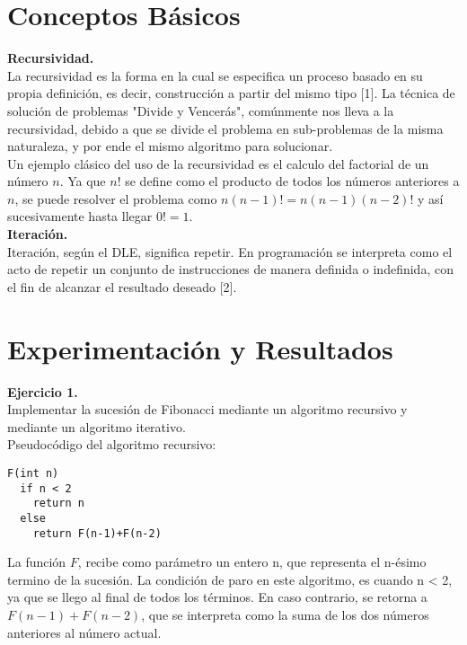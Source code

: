 \documentclass[12pt]{report}
\begin{document}
	\section{Conceptos Básicos}
	\textbf{Recursividad.}\\
	La recursividad es la forma en la cual se especifica un proceso basado en su propia definición, es decir, construcción a partir del mismo tipo [1]. La técnica de solución de problemas "Divide y Vencerás", comúnmente nos lleva a la recursividad, debido a que se divide el problema en sub-problemas de la misma naturaleza, y por ende el mismo algoritmo para solucionar.\\ 
	Un ejemplo clásico del uso de la recursividad es el calculo del factorial de un número $n$. Ya que $n!$ se define como el producto de todos los números anteriores a $n$, se puede resolver el problema como $n(n-1)!=n(n-1)(n-2)!$ y así sucesivamente hasta llegar $0!=1$.\\
	
	\textbf{Iteración.}\\
	Iteración, según el DLE, significa repetir. En programación se interpreta como el acto de repetir un conjunto de instrucciones de manera definida o indefinida, con el fin de alcanzar el resultado deseado [2].
	
	
	
	\section{Experimentación y Resultados}	
	\textbf{Ejercicio 1.}\\
	
	Implementar la sucesión de Fibonacci mediante un algoritmo recursivo y mediante un algoritmo iterativo.\newline \\
	Pseudocódigo del algoritmo recursivo:
	\lstset{language=C, breaklines=true, basicstyle=\footnotesize}
	\lstset{numbers=left, numberstyle=\tiny, stepnumber=1, numbersep=10pt}
	\begin{lstlisting}
F(int n)
  if n < 2
    return n
  else
    return F(n-1)+F(n-2)
	\end{lstlisting}
	
	La función $F$, recibe como parámetro un entero n, que representa el n-ésimo termino de la sucesión. La condición de paro en este algoritmo, es cuando n < 2, ya que se llego al final de todos los términos. En caso contrario, se retorna a $F(n-1)+F(n-2)$, que se interpreta como la suma de los dos números anteriores al número actual. \\
	
\end{document}
